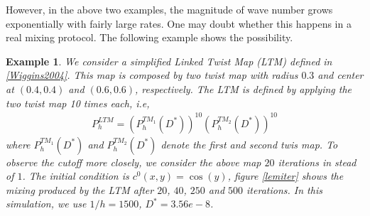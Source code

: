 \documentclass{article}
\newtheorem{example}{Example}
\begin{document}
However, in the above two examples, the magnitude of wave number grows exponentially
with fairly large rates. One may doubt whether this happens in a real mixing protocol.
The following example shows the possibility.

\begin{example}
\label{LTM example}
We consider a simplified Linked Twist Map (LTM) defined in \ref{Wiggins2004}. This map
is composed by two twist map with radius $0.3$ and center at $(0.4,0.4)$ and $(0.6,0.6)$,
respectively. The LTM is defined by applying the two twist map 10 times each, i.e,
\begin{eqnarray}
 P^{LTM}_{h} = (P_{h}^{TM_1}(D^*))^{10}(P_{h}^{TM_2}(D^*))^{10}
\end{eqnarray}
where $P_{h}^{TM_1}(D^*)$ and $P_{h}^{TM_2}(D^*)$ denote the first and second twis map.
To observe the cutoff more closely, we consider the above map $20$ iterations in stead of $1$.
The initial condition is $c^0(x,y) = \cos(y)$, figure \ref{lemiter} shows the mixing produced by
the LTM after $20$, $40$, $250$ and $500$ iterations. In this simulation, we use $1/h = 1500$,
$D^* = 3.56e-8$.



\end{example}
\end{document}
